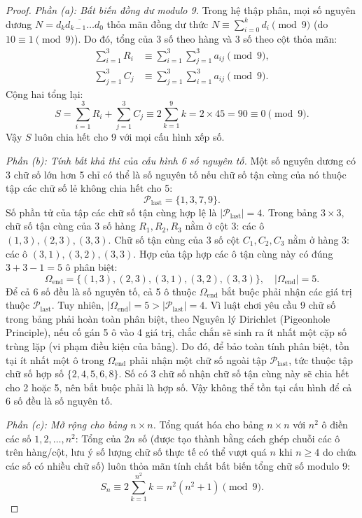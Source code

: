 \documentclass{article}
\begin{document}
\begin{proof}
\emph{Phần (a): Bất biến đồng dư modulo 9.}
Trong hệ thập phân, mọi số nguyên dương $N = \overline{d_k d_{k-1} \dots d_0}$ thỏa mãn đồng dư thức $N \equiv \sum_{i=0}^k d_i \pmod 9$ (do $10 \equiv 1 \pmod 9$).
Do đó, tổng của 3 số theo hàng và 3 số theo cột thỏa mãn:
\begin{align}
    \sum_{i=1}^3 R_i &\equiv \sum_{i=1}^3 \sum_{j=1}^3 a_{ij} \pmod 9, \\
    \sum_{j=1}^3 C_j &\equiv \sum_{j=1}^3 \sum_{i=1}^3 a_{ij} \pmod 9.
\end{align}
Cộng hai tổng lại:
\begin{equation}
    S = \sum_{i=1}^3 R_i + \sum_{j=1}^3 C_j \equiv 2 \sum_{k=1}^9 k = 2 \times 45 = 90 \equiv 0 \pmod 9.
\end{equation}
Vậy $S$ luôn chia hết cho 9 với mọi cấu hình xếp số.

\emph{Phần (b): Tính bất khả thi của cấu hình 6 số nguyên tố.}
Một số nguyên dương có 3 chữ số lớn hơn 5 chỉ có thể là số nguyên tố nếu chữ số tận cùng của nó thuộc tập các chữ số lẻ không chia hết cho 5:
\begin{equation}
    \mathcal{P}_{\text{last}} = \{1, 3, 7, 9\}.
\end{equation}
Số phần tử của tập các chữ số tận cùng hợp lệ là $|\mathcal{P}_{\text{last}}| = 4$.
Trong bảng $3 \times 3$, chữ số tận cùng của 3 số hàng $R_1, R_2, R_3$ nằm ở cột 3: các ô $(1, 3), (2, 3), (3, 3)$.
Chữ số tận cùng của 3 số cột $C_1, C_2, C_3$ nằm ở hàng 3: các ô $(3, 1), (3, 2), (3, 3)$.
Hợp của tập hợp các ô tận cùng này có đúng $3 + 3 - 1 = 5$ ô phân biệt:
\begin{equation}
    \Omega_{\text{end}} = \{(1, 3), (2, 3), (3, 1), (3, 2), (3, 3)\}, \quad |\Omega_{\text{end}}| = 5.
\end{equation}
Để cả 6 số đều là số nguyên tố, cả 5 ô thuộc $\Omega_{\text{end}}$ bắt buộc phải nhận các giá trị thuộc $\mathcal{P}_{\text{last}}$.
Tuy nhiên, $|\Omega_{\text{end}}| = 5 > |\mathcal{P}_{\text{last}}| = 4$. Vì luật chơi yêu cầu 9 chữ số trong bảng phải hoàn toàn phân biệt, theo Nguyên lý Dirichlet (Pigeonhole Principle), nếu cố gán 5 ô vào 4 giá trị, chắc chắn sẽ sinh ra ít nhất một cặp số trùng lặp (vi phạm điều kiện của bảng). Do đó, để bảo toàn tính phân biệt, tồn tại ít nhất một ô trong $\Omega_{\text{end}}$ phải nhận một chữ số ngoài tập $\mathcal{P}_{\text{last}}$, tức thuộc tập chữ số hợp số $\{2, 4, 5, 6, 8\}$.
Số có 3 chữ số nhận chữ số tận cùng này sẽ chia hết cho 2 hoặc 5, nên bắt buộc phải là hợp số.
Vậy không thể tồn tại cấu hình để cả 6 số đều là số nguyên tố.

\emph{Phần (c): Mở rộng cho bảng $n \times n$.}
Tổng quát hóa cho bảng $n \times n$ với $n^2$ ô điền các số $1, 2, \dots, n^2$:
Tổng của $2n$ số (được tạo thành bằng cách ghép chuỗi các ô trên hàng/cột, lưu ý số lượng chữ số thực tế có thể vượt quá $n$ khi $n \ge 4$ do chứa các số có nhiều chữ số) luôn thỏa mãn tính chất bất biến tổng chữ số modulo 9:
\begin{equation}
    S_n \equiv 2 \sum_{k=1}^{n^2} k = n^2(n^2 + 1) \pmod 9.
\end{equation}
\end{proof}
\end{document}
